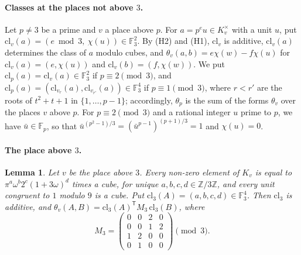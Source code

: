 \documentclass[11pt]{article}
\newtheorem{lemma}[theorem]{Lemma}
\newcommand{\Z}{\mathbb{Z}}
\newcommand{\F}{\mathbb{F}}
\begin{document}
\paragraph{Classes at the places not above $3$.} Let $p\neq3$ be a prime and $v$ a place above $p$. For $a=p^eu\in K_v^\times$ with a unit $u$, put $\mathrm{cl}_v(a)=(e\bmod3,\ \chi(u))\in\F_3^2$. By (H2) and (H1), $\mathrm{cl}_v$ is additive, $\mathrm{cl}_v(a)$ determines the class of $a$ modulo cubes, and $\theta_v(a,b)=e\chi(w)-f\chi(u)$ for $\mathrm{cl}_v(a)=(e,\chi(u))$ and $\mathrm{cl}_v(b)=(f,\chi(w))$. We put $\mathrm{cl}_p(a)=\mathrm{cl}_v(a)\in\F_3^2$ if $p\equiv2\pmod3$, and $\mathrm{cl}_p(a)=(\mathrm{cl}_{v_r}(a),\mathrm{cl}_{v_{r'}}(a))\in\F_3^4$ if $p\equiv1\pmod3$, where $r<r'$ are the roots of $t^2+t+1$ in $\{1,\dots,p-1\}$; accordingly, $\theta_p$ is the sum of the forms $\theta_v$ over the places $v$ above $p$. For $p\equiv2\pmod3$ and a rational integer $u$ prime to $p$, we have $\bar u\in\F_p$, so that $\bar u^{(p^2-1)/3}=(\bar u^{p-1})^{(p+1)/3}=1$ and $\chi(u)=0$.

\paragraph{The place above $3$.}
\begin{lemma}\label{lem:cM3}
Let $v$ be the place above $3$. Every non-zero element of $K_v$ is equal to $\pi^a\omega^b2^c(1+3\omega)^d$ times a cube, for unique $a,b,c,d\in\Z/3\Z$, and every unit congruent to $1$ modulo $9$ is a cube. Put $\mathrm{cl}_3(A)=(a,b,c,d)\in\F_3^4$. Then $\mathrm{cl}_3$ is additive, and $\theta_v(A,B)=\mathrm{cl}_3(A)^{\mathsf T}M_3\,\mathrm{cl}_3(B)$, where
\[
M_3=\begin{pmatrix}0&0&2&0\\0&0&1&2\\1&2&0&0\\0&1&0&0\end{pmatrix}\pmod3.
\]
\end{lemma}
\end{document}
